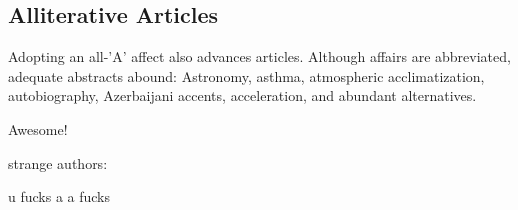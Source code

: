 \documentclass[twocolumn]{article}
\begin{document}

\subsection{Alliterative Articles}

Adopting an all-'A' affect also advances articles. Although affairs
are abbreviated, adequate abstracts abound: Astronomy, asthma,
atmospheric acclimatization, autobiography, Azerbaijani accents,
acceleration, and abundant alternatives.


Awesome!

strange authors:

u fucks
a a fucks




\end{document}
